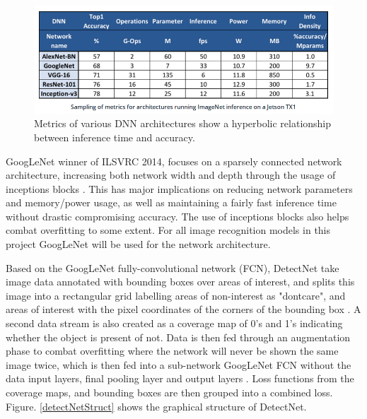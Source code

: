 \documentclass[10pt,journal,compsoc]{IEEEtran}
\begin{document}
\begin{figure}[thpb]
  \centering
  \includegraphics[width=\linewidth]{../img/DNN_metrics.png}
  \caption{Metrics of various DNN architectures show a hyperbolic relationship between inference time and accuracy.}
  \label{DNNMetric}
\end{figure}

GoogLeNet winner of ILSVRC 2014, focuses on a sparsely connected network architecture, increasing both network width and depth through the usage of inceptions blocks \cite{DBLP:journals/corr/SzegedyLJSRAEVR14}. This has major implications on reducing network parameters and memory/power usage, as well as maintaining a fairly fast inference time without drastic compromising accuracy. The use of inceptions blocks also helps combat overfitting to some extent. For all image recognition models in this project GoogLeNet will be used for the network architecture.

Based on the GoogLeNet fully-convolutional network (FCN), DetectNet take image data annotated with bounding boxes over areas of interest, and splits this image into a rectangular grid labelling areas of non-interest as "dontcare", and areas of interest with the pixel coordinates of the corners of the bounding box \cite{NvidiaDN}. A second data stream is also created as a coverage map of 0's and 1's indicating whether the object is present of not. Data is then fed through an augmentation phase to combat overfitting where the network will never be shown the same image twice, which is then fed into a sub-network GoogLeNet FCN without the data input layers, final pooling layer and output layers \cite{NvidiaDN}. Loss functions from the coverage maps, and bounding boxes are then grouped into a combined loss. Figure. \ref{detectNetStruct} shows the graphical structure of DetectNet.
\end{document}
